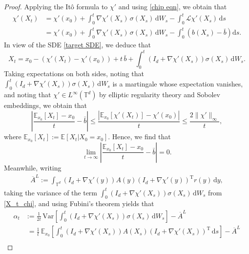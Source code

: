 \documentclass[12pt,a4paper,reqno]{amsart}
\numberwithin{equation}{section}
\begin{document}
\begin{proof}
     Applying the It\^{o} formula to $\chi'$ and using \eqref{chip eqn}, we obtain that
    \begin{align*}
            \chi'(X_t) &= \chi'(x_0) +\int_0^t \nabla \chi'(X_s)\, \sigma (X_s)\,\mathrm{d}W_s - \int_0^t\mathcal{L}\chi'(X_s)\, \mathrm{d}s\\
            &= \chi'(x_0) +\int_0^t \nabla \chi'(X_s)\, \sigma (X_s)\,\mathrm{d}W_s - \int_0^t \left(b(X_s)-\bar{b}\right) \mathrm{d}s.
    \end{align*}  
    In view of the SDE \eqref{target SDE}, we deduce that 
    \begin{equation}\label{X_t_chi}    
        X_t = x_0 - \left(\chi'(X_t) - \chi'(x_0)\right) + t\, \bar{b} + 
 \int_0^t \left(I_d + \nabla \chi'(X_s) \right) \sigma(X_s)\,\mathrm{d} W_s.
        \end{equation}
 Taking expectations on both sides, noting that $\int_0^t \left(I_d + \nabla \chi'(X_s) \right) \sigma(X_s)\,\mathrm{d} W_s$ is a martingale whose expectation vanishes, and noting that $\chi'\in L^{\infty}(\mathbb{T}^d)$ by elliptic regularity theory and Sobolev embeddings, we obtain that
\begin{equation}\label{moment_est}
        \left|\frac{\mathbb{E}_{x_0}[X_t] -x_0}{t} - \bar{b}\right| \le  \frac{\left|\mathbb{E}_{x_0}[\chi'(X_t)] - \chi'(x_0)\right|}{t}\le  \frac{ 2\|\chi'\|_{\infty}}{t},
\end{equation}
where $\mathbb{E}_{x_0}[X_t]:=\mathbb{E}[X_t|X_0 = x_0]$. Hence, we find that
\begin{equation*}
    \lim_{t\rightarrow \infty}\left|\frac{\mathbb{E}_{x_0}[X_t] -x_0}{t} - \bar{b}\right| = 0.
\end{equation*}
Meanwhile, writing 
\begin{align*}
    \overline{A}^L := \int_{\mathbb{T}^d} \left(I_d + \nabla \chi'(y)\right)A(y)\left(I_d+\nabla \chi'(y)\right)^{\mathrm{T}}r(y)\,\mathrm{d}y,
\end{align*}
taking the variance of the term $\int_0^t \left(I_d + \nabla \chi'(X_s)\right) \sigma(X_s)\,\mathrm{d} W_s$ from \eqref{X_t_chi}, and using Fubini's theorem yields that
\begin{align*}
        \alpha_t &:=\frac{1}{2t}\,\mathrm{Var}\left[\int_0^t \left(I_d + \nabla \chi'(X_s)\right)\sigma(X_s)\,\mathrm{d}W_s\right] - \overline{A}^L \\&\;= \frac{1}{t}\,\mathbb{E}_{x_0}\left[\int_0^t \left(I_d + \nabla \chi'(X_s)\right)A(X_s)\left(I_d + \nabla \chi'(X_s)\right)^{\mathrm{T}}\,\mathrm{d}s\right] - \overline{A}^L\\

\end{align*}
\end{proof}
\end{document}
